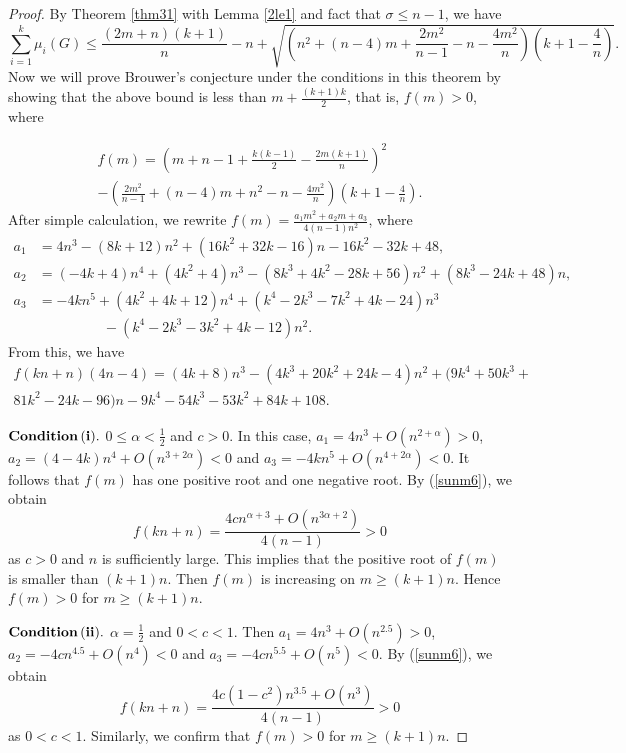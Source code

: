 \documentclass[12pt]{article}
\begin{document}
\begin{proof}
 By Theorem \ref{thm31} with Lemma \ref{2le1} and fact that $\sigma\leq
 n-1$, we have
 $$ \sum_{i=1}^{k}\mu_i(G)\leq\frac{(2m+n)(k+1)}{n}-n+\sqrt
    {\left(n^2+(n-4)m+\frac{2m^2}{n-1}-n-\frac{4m^2}{n}\right)\left(k+1-\frac
    {4}{n}\right)}.$$
 Now we will prove Brouwer's conjecture under the conditions in
 this theorem by showing that the above bound  is less than
 $m+\frac{(k+1)k}{2}$, that is, $f(m)>0$, where

\begin{multline*}
  f(m)=\left(m+n-1+\frac{k(k-1)}{2}-\frac{2m(k+1)}{n}\right)^2\\
  -\left(\frac{2m^2}{n-1}+(n-4)m+n^2-n-\frac{4m^2}{n}\right)\left(k+1-\frac{4}{n}\right).
\end{multline*}
 After simple calculation, we rewrite $f(m)=\frac{a_1m^2+a_2m+a_3}{4(n-1)n^2}$, where
\begin{align*}
a_1&=4n^3-(8k+12)n^2+(16k^2+32k-16)n-16k^2-32k+48,\\
a_2&=(-4k+4)n^4+(4k^2+4)n^3-(8k^3+4k^2-28k+56)n^2+(8k^3-24k+48)n,\\
a_3&=-4kn^5+(4k^2+4k+12)n^4+(k^4-2k^3-7k^2+4k-24)n^3\\
&~~~~~~~~~~~~~~~~~~~~~-(k^4-2k^3-3k^2+4k-12)n^2.
\end{align*}
 From this, we have
\begin{multline}
 f(kn+n)(4n-4)=(4k+8)n^3-(4k^3+20k^2+24k-4)n^2+(9k^4+ 50k^3+ \\81k^2- 24k -96)n- 9k^4 - 54k^3- 53k^2 + 84k +
 108. \label{sunm6}
\end{multline}

\noindent
${\bf Condition\,(i).}$  $0\leq\alpha<\frac{1}{2}$ and $c>0$. In this case,  $a_1=4n^3+O(n^{2+\alpha})>0$, $a_2=(4-4k)n^4+O(n^{3+2\alpha})<0$ and
$a_3=-4kn^5+O(n^{4+2\alpha})<0$. It follows that $f(m)$ has one positive root and one negative root. By (\ref{sunm6}), we obtain 
     $$f(kn+n)=\frac{4cn^{\alpha+3}+O(n^{3\alpha+2})}{4(n-1)}>0$$
as $c>0$ and $n$ is sufficiently large. This implies that the positive root of $f(m)$ is smaller than $(k+1)n$. Then $f(m)$ is
increasing on $m\geq (k+1)n$. Hence $f(m)>0$ for $m\geq (k+1)n$.

\vspace*{3mm}

\noindent
${\bf Condition\,(ii).}$  $\alpha=\frac{1}{2}$ and $0<c<1$. Then $a_1=4n^3+O(n^{2.5})>0$, $a_2=-4cn^{4.5}+O(n^{4})<0$ and
$a_3=-4cn^{5.5}+O(n^{5})<0$. By (\ref{sunm6}), we obtain
   $$f(kn+n)=\frac{4c(1-c^2)n^{3.5}+O(n^3)}{4(n-1)}>0$$ 
as $0<c<1$. Similarly, we confirm that $f(m)>0$ for $m\geq (k+1)n$.


\end{proof}
\end{document}
